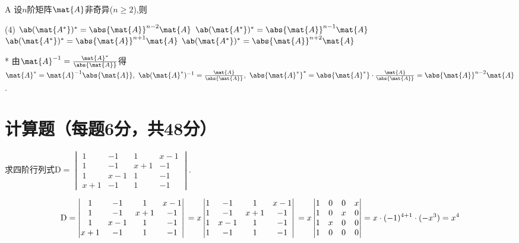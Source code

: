 \begin{choice}{A}
    设$n$阶矩阵$\mat{A}$非奇异($n\geq 2$),则
\begin{tasks}(4)
    \task $\ab(\mat{A^*})^*=\abs{\mat{A}}^{n-2}\mat{A}$
    \task $\ab(\mat{A^*})^*=\abs{\mat{A}}^{n-1}\mat{A}$
    \task $\ab(\mat{A^*})^*=\abs{\mat{A}}^{n+1}\mat{A}$
    \task $\ab(\mat{A^*})^*=\abs{\mat{A}}^{n+2}\mat{A}$
\end{tasks}
\end{choice}
\begin{solution}*
    由$\mat{A}^{-1}=\frac{\mat{A}^*}{\abs{\mat{A}}}$得$\mat{A}^*=\mat{A}^{-1}\abs{\mat{A}},\ \ab(\mat{A}^*)^{-1}=\frac{\mat{A}}{\abs{\mat{A}}},\ \abs{\mat{A}^*}^*=\abs{\mat{A}^*}\cdot\frac{\mat{A}}{\abs{\mat{A}}}=\abs{\mat{A}}^{n-2}\mat{A}$. 
\end{solution}

\newpage
\section{计算题（每题6分，共48分）}
\setcounter{prob}{0}
\begin{problem}
    求四阶行列式$\mathrm{D}=\begin{vmatrix}
        1 & -1 & 1 & x-1\\
        1 & -1 & x+1 & -1\\
        1 & x-1 & 1 & -1\\
        x+1 & -1 & 1 & -1
    \end{vmatrix}$.
\end{problem}
\begin{solution}
    \[
        \mathrm{D}=\begin{vmatrix}
            1 & -1 & 1 & x-1\\
            1 & -1 & x+1 & -1\\
            1 & x-1 & 1 & -1\\
            x+1 & -1 & 1 & -1
        \end{vmatrix}\\
        =x\begin{vmatrix}
            1 & -1 & 1 & x-1\\
            1 & -1 & x+1 & -1\\
            1 & x-1 & 1 & -1\\
            1 & -1 & 1 & -1
        \end{vmatrix}\\
        =x
        \begin{vmatrix}
            1 & 0 & 0 & x\\
            1 & 0 & x & 0\\
            1 & x & 0 & 0\\
            1 & 0 & 0 & 0
        \end{vmatrix}=x\cdot(-1)^{4+1}\cdot(-x^3)=x^4
    \]
\end{solution}


